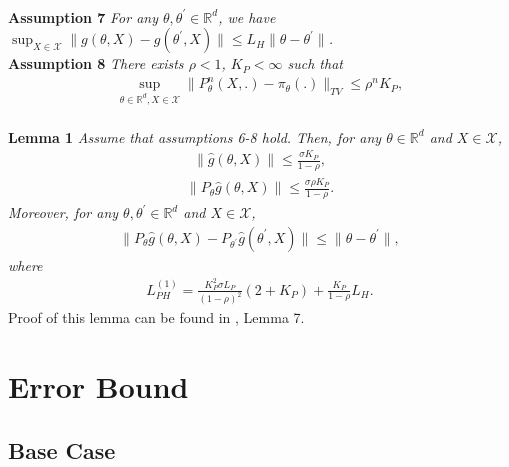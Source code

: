 \documentclass[a4paper]{article}
\newcommand{\norm}[1]{\|#1 \|}
\newcommand{\constLPH}[1]{L_{PH}^{(#1)}}
\begin{document}
	\\
	\textbf{Assumption 7} \textit{
		For any $\theta, \theta^{\prime} \in \mathbb{R}^{d}$, we have $\sup_{X \in \mathcal{X}}\norm{g\left(\theta, X\right) - g\left(\theta^{\prime}, X\right)} \le L_{H}\norm{\theta - \theta^{\prime}}$.
	}
	\\
	\textbf{Assumption 8} \textit{
		There exists $\rho < 1$, $K_{P} < \infty$ such that
		\begin{align*}
			\sup_{\theta \in \mathbb{R}^{d}, X \in \mathcal{X}} \norm{P_{\theta}^{n}\left(X, .\right) - \pi_{\theta}(.)}_{TV} \le \rho^{n}K_{P},
		\end{align*}
	}
	\\
	\textbf{Lemma 1} \textit{
		Assume that assumptions 6-8 hold. Then, for any $\theta \in \mathbb{R}^{d}$ and $X \in \mathcal{X}$,
		\begin{align*}
			\norm{\hat{g}\left(\theta, X\right)} \le \frac{\sigma K_{P}}{1 - \rho},
		\end{align*}
		\begin{align*}
			\norm{P_{\theta}\hat{g}\left(\theta, X\right)} \le \frac{\sigma \rho K_{P}}{1 - \rho}.
		\end{align*}
		Moreover, for any $\theta, \theta^{\prime} \in \mathbb{R}^{d}$ and $X \in \mathcal{X}$,
		\begin{align*}
			\norm{P_{\theta}\hat{g}\left(\theta, X\right) - P_{\theta^{\prime}}\hat{g}\left(\theta^{\prime}, X\right)} \le \norm{\theta - \theta^{\prime}},
		\end{align*}
		where
		\begin{align*}
			\constLPH{1} = \frac{K_{P}^{2}\sigma L_{P}}{(1 - \rho)^{2}}\left(2 + K_{P}\right) + \frac{K_{P}}{1 - \rho}L_{H}.
		\end{align*}
	}
	Proof of this lemma can be found in \cite{karimi2019non}, Lemma 7.
	\section{Error Bound}
	
	
	\subsection{Base Case}
	
\end{document}

